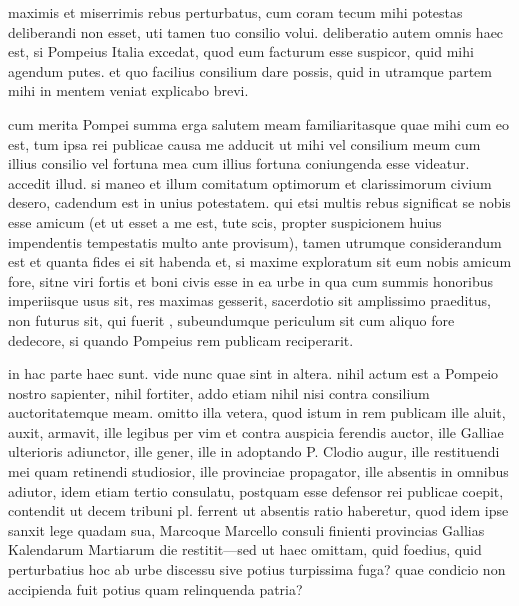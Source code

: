 


 maximis et miserrimis rebus perturbatus, cum coram tecum mihi potestas deliberandi non esset, uti tamen tuo consilio volui. deliberatio autem omnis haec est, si Pompeius Italia excedat, quod eum facturum esse suspicor, quid mihi agendum putes. et quo facilius consilium dare possis, quid in utramque partem mihi in mentem veniat explicabo brevi.

 cum merita Pompei summa erga salutem meam familiaritasque quae mihi cum eo est, tum ipsa rei publicae causa me adducit ut mihi vel consilium meum cum illius consilio vel fortuna mea cum illius fortuna coniungenda esse videatur. accedit illud. si maneo et illum comitatum optimorum et clarissimorum civium desero, cadendum est in unius potestatem. qui etsi multis rebus significat se nobis esse amicum (et ut esset a me est, tute scis, propter suspicionem huius impendentis tempestatis multo ante provisum), tamen utrumque considerandum est et quanta fides ei sit habenda et, si maxime exploratum sit eum nobis amicum fore, sitne viri fortis et boni civis esse in ea urbe in qua cum summis honoribus imperiisque usus sit, res maximas gesserit, sacerdotio sit amplissimo praeditus, non futurus sit, qui fuerit , subeundumque periculum sit cum aliquo fore dedecore, si quando Pompeius rem publicam reciperarit.

 in hac parte haec sunt. vide nunc quae sint in altera. nihil actum est a Pompeio nostro sapienter, nihil fortiter, addo etiam nihil nisi contra consilium auctoritatemque meam. omitto illa vetera, quod istum in rem publicam ille aluit, auxit, armavit, ille legibus per vim et contra auspicia ferendis auctor, ille Galliae ulterioris adiunctor, ille gener, ille in adoptando P. Clodio augur, ille restituendi mei quam retinendi studiosior, ille provinciae propagator, ille absentis in omnibus adiutor, idem etiam tertio consulatu, postquam esse defensor rei publicae coepit, contendit ut decem tribuni pl. ferrent ut absentis ratio haberetur, quod idem ipse sanxit lege quadam sua, Marcoque Marcello consuli finienti provincias Gallias Kalendarum Martiarum die restitit—sed ut haec omittam, quid foedius, quid perturbatius hoc ab urbe discessu sive potius turpissima fuga? quae condicio non accipienda fuit potius quam relinquenda patria?

